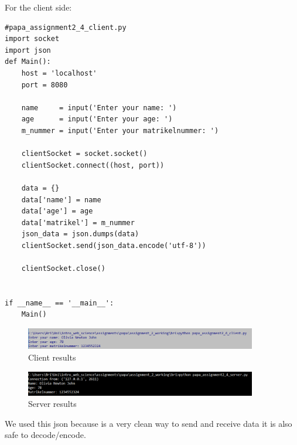 \documentclass{WeSTassignment}
\begin{document}
For the client side:
\begin{lstlisting}
#papa_assignment2_4_client.py
import socket
import json 
def Main():
    host = 'localhost'
    port = 8080

    name     = input('Enter your name: ')
    age      = input('Enter your age: ')
    m_nummer = input('Enter your matrikelnummer: ')

    clientSocket = socket.socket()
    clientSocket.connect((host, port))

    data = {}
    data['name'] = name
    data['age'] = age
    data['matrikel'] = m_nummer
    json_data = json.dumps(data)
    clientSocket.send(json_data.encode('utf-8'))

    clientSocket.close()


if __name__ == '__main__':
    Main()
\end{lstlisting}
\begin{figure}[h]
  	\centering
  	\includegraphics[width=0.9\textwidth]{results_client.png}
   	\caption{Client results}
     \label{fig:client}
\end{figure}
\begin{figure}[h]
  	\centering
  	\includegraphics[width=0.9\textwidth]{results_server.png}
   	\caption{Server results}
     \label{fig:server}
\end{figure}


We used this json because is a very clean way to send and receive data it is also safe to decode/encode.
\makefooter
\end{document}
